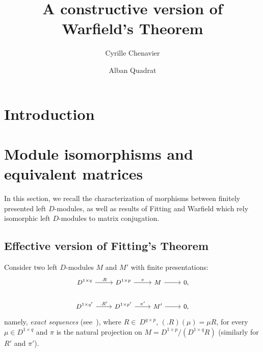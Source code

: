 \documentclass{ifacconf}
\begin{document}
\begin{frontmatter}

\title{A constructive version of Warfield's Theorem} 


\author[First]{Cyrille Chenavier} 
\author[Second]{Alban Quadrat} 


\address[First]{Inria Lille - Nord Europe,
  Villeneuve d'Ascq, France (e-mail: cyrille.chenavier@inria.fr).}
\address[Second]{Inria Paris, Universit\'e Pierre et Marie Curie,  
   Paris, France (e-mail: alban.quadrat@inria.fr).}

\begin{abstract}                %
\end{abstract}

\begin{keyword}

\end{keyword}

\end{frontmatter}

\section{Introduction}


\section{Module isomorphisms and equivalent matrices}

In this section, we recall the characterization of morphisms between
finitely presented left $D$-modules, as well as results of Fitting and
Warfield which rely isomorphic left $D$-modules to matrix conjugation.

\subsection{Effective version of Fitting's Theorem}

Consider two left $D$-modules $M$ and $M'$ with finite presentations:
\begin{equation}\label{equ:presentations}
  \begin{small}
    \begin{tikzcd}
      D^{1\times q}\arrow[r, ".R"] &
      D^{1\times p}\arrow[r, "\pi"] &
      M\arrow[r] &
      0, 
      \\
        D^{1\times q'}\arrow[r, ".R'"] &
        D^{1\times p'}\arrow[r, "\pi'"] &
        M'\arrow[r] &
        0, 
    \end{tikzcd}
  \end{small}
\end{equation}
namely, \emph{exact sequences} (see~\cite{Ro:09}), where
$R\in~ D^{q\times p}$, $(.R)(\mu)=\mu R$, for every $\mu\in D^{1\times q}$
and $\pi$ is the natural projection on $M=D^{1\times p}/(D^{1\times q}R)$
(similarly for $R'$ and $\pi'$).
\end{document}

